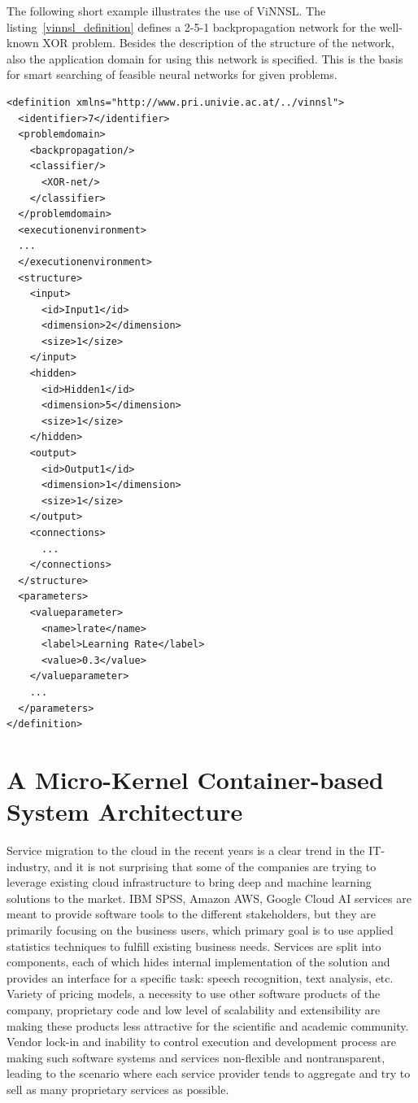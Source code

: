 \documentclass[conference]{IEEEtran}
\begin{document}
The following short example illustrates the use of ViNNSL. The listing~\ref{vinnsl_definition} defines 
a 2-5-1 backpropagation network for the well-known XOR problem. Besides the description of the structure of the network, also the application domain for using this network is specified. This is the basis for smart searching of feasible neural networks for given problems.

\lstset{language=XML}
\begin{lstlisting}[float,caption={ViNNSL: XOR-Backpropagation Neural Network Definition},label={vinnsl_definition}]
<definition xmlns="http://www.pri.univie.ac.at/../vinnsl">
  <identifier>7</identifier>
  <problemdomain>
    <backpropagation/>
    <classifier/>
      <XOR-net/>
    </classifier>
  </problemdomain>
  <executionenvironment>
  ...
  </executionenvironment>
  <structure>
    <input>
      <id>Input1</id>
      <dimension>2</dimension>
      <size>1</size>
    </input>
    <hidden>
      <id>Hidden1</id>
      <dimension>5</dimension>
      <size>1</size>
    </hidden>
    <output>
      <id>Output1</id>
      <dimension>1</dimension>
      <size>1</size>
    </output>
    <connections>
      ...
    </connections>
  </structure>
  <parameters>
    <valueparameter>
      <name>lrate</name>
      <label>Learning Rate</label>
      <value>0.3</value>
    </valueparameter>
    ...
  </parameters>
</definition>\end{lstlisting}


\section{A Micro-Kernel Container-based System Architecture}
\label{sec:architecture}

Service migration to the cloud in the recent years is a clear trend in the IT-industry, and it is not surprising that some of the companies are trying to leverage existing cloud infrastructure to bring deep and machine learning solutions to the market. IBM SPSS, Amazon AWS, Google Cloud AI services are meant to provide software tools to the different stakeholders, but they are primarily focusing on the business users, which primary goal is to use applied statistics techniques to fulfill existing business needs. Services are split into components, each of which hides internal implementation of the solution and provides an interface for a specific task: speech recognition, text analysis, etc. Variety of pricing models, a necessity to use other software products of the company, proprietary code and low level of scalability and extensibility are making these products less attractive for the scientific and academic community. Vendor lock-in and inability to control execution and development process are making such software systems and services non-flexible and nontransparent, leading to the scenario where each service provider tends to aggregate and try to sell as many proprietary services as possible.
\end{document}
